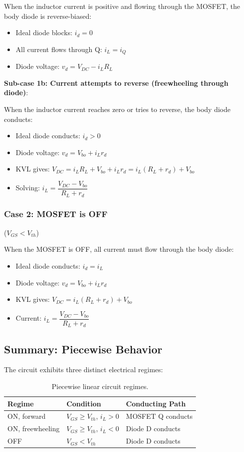\documentclass[11pt, a4paper]{article}
\newcommand{\vgs}{V_{GS}}
\newcommand{\vth}{V_{th}}
\begin{document}
When the inductor current is positive and flowing through the MOSFET, the body diode is reverse-biased:
\begin{itemize}
    \item Ideal diode blocks: $i_d = 0$
    \item All current flows through Q: $i_L = i_Q$
    \item Diode voltage: $v_d = V_{DC} - i_L R_L$
\end{itemize}

\textbf{Sub-case 1b: Current attempts to reverse (freewheeling through diode)}:

When the inductor current reaches zero or tries to reverse, the body diode conducts:
\begin{itemize}
    \item Ideal diode conducts: $i_d > 0$
    \item Diode voltage: $v_d = V_{bo} + i_L r_d$
    \item KVL gives: $V_{DC} = i_L R_L + V_{bo} + i_L r_d = i_L(R_L + r_d) + V_{bo}$
    \item Solving: $i_L = \dfrac{V_{DC} - V_{bo}}{R_L + r_d}$
\end{itemize}

\subsubsection{Case 2: MOSFET is OFF} ($\vgs < \vth$)

When the MOSFET is OFF, all current must flow through the body diode:
\begin{itemize}
    \item Ideal diode conducts: $i_d = i_L$
    \item Diode voltage: $v_d = V_{bo} + i_L r_d$
    \item KVL gives: $V_{DC} = i_L(R_L + r_d) + V_{bo}$
    \item Current: $i_L = \dfrac{V_{DC} - V_{bo}}{R_L + r_d}$
\end{itemize}

\subsection{Summary: Piecewise Behavior}

The circuit exhibits three distinct electrical regimes:

\begin{table}[h]
\centering
\small
\begin{tabular}{lll}
\toprule
\textbf{Regime} & \textbf{Condition} & \textbf{Conducting Path} \\
\midrule
ON, forward & $\vgs \geq \vth$, $i_L > 0$ & MOSFET Q conducts \\
ON, freewheeling & $\vgs \geq \vth$, $i_L < 0$ & Diode D conducts \\
OFF & $\vgs < \vth$ & Diode D conducts \\
\bottomrule
\end{tabular}
\caption{Piecewise linear circuit regimes.}
\end{table}
\end{document}
